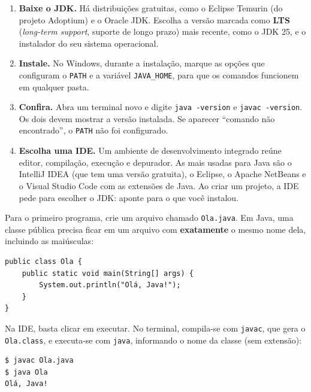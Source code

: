 \begin{enumerate}
  \item \textbf{Baixe o JDK.} Há distribuições gratuitas, como o Eclipse Temurin (do projeto Adoptium) e o Oracle JDK. Escolha a versão marcada como \textbf{LTS} (\textit{long-term support}, suporte de longo prazo) mais recente, como o JDK 25, e o instalador do seu sistema operacional.
  \item \textbf{Instale.} No Windows, durante a instalação, marque as opções que configuram o \texttt{PATH} e a variável \texttt{JAVA\_HOME}, para que os comandos funcionem em qualquer pasta.
  \item \textbf{Confira.} Abra um terminal novo e digite \texttt{java -version} e \texttt{javac -version}. Os dois devem mostrar a versão instalada. Se aparecer ``comando não encontrado'', o \texttt{PATH} não foi configurado.
  \item \textbf{Escolha uma IDE.} Um ambiente de desenvolvimento integrado reúne editor, compilação, execução e depurador. As mais usadas para Java são o IntelliJ IDEA (que tem uma versão gratuita), o Eclipse, o Apache NetBeans e o Visual Studio Code com as extensões de Java. Ao criar um projeto, a IDE pede para escolher o JDK: aponte para o que você instalou.
\end{enumerate}

Para o primeiro programa, crie um arquivo chamado \texttt{Ola.java}. Em Java, uma classe pública precisa ficar em um arquivo com \textbf{exatamente} o mesmo nome dela, incluindo as maiúsculas:

\begin{codigo}
\begin{Verbatim}[breaklines=true, breaksymbolleft={}, fontsize=\footnotesize]
public class Ola {
    public static void main(String[] args) {
        System.out.println("Olá, Java!");
    }
}
\end{Verbatim}
\end{codigo}

Na IDE, basta clicar em executar. No terminal, compila-se com \texttt{javac}, que gera o \texttt{Ola.class}, e executa-se com \texttt{java}, informando o nome da classe (sem extensão):

\begin{codigo}
\begin{Verbatim}[breaklines=true, breaksymbolleft={}, fontsize=\footnotesize]
$ javac Ola.java
$ java Ola
Olá, Java!
\end{Verbatim}
\end{codigo}

